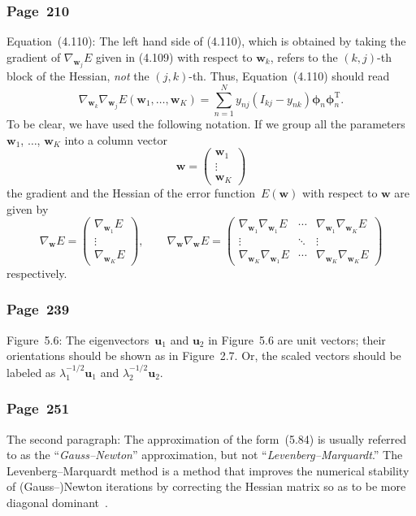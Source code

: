 \documentclass[12pt,a4paper]{article}
\newcommand{\erratum}[1]{\subsubsection*{#1}}
\begin{document}
\erratum{Page~210}
Equation~(4.110):
The left hand side of (4.110),
which is obtained by taking the gradient of $\nabla_{\mathbf{w}_{j}} E$ given in (4.109)
with respect to $\mathbf{w}_{k}$,
refers to the $(k, j)$-th block of the Hessian, \emph{not} the $(j, k)$-th.
Thus, Equation~(4.110) should read
\begin{equation}
\nabla_{\mathbf{w}_{k}} \nabla_{\mathbf{w}_{j}}
E \left( \mathbf{w}_{1}, \dots, \mathbf{w}_{K} \right)
  = \sum_{n=1}^{N} y_{nj} \left( I_{kj} - y_{nk} \right)
    \bm{\phi}_{n} \bm{\phi}_{n}^{\operatorname{T}}.
\end{equation}
To be clear, we have used the following notation.
If we group all the parameters~$\mathbf{w}_{1}$, $\dots$, $\mathbf{w}_{K}$ into
a column vector
\begin{equation}
\mathbf{w} =
  \begin{pmatrix}
  \mathbf{w}_{1} \\
  \vdots \\
  \mathbf{w}_{K}
  \end{pmatrix}
\end{equation}
the gradient and the Hessian of the error function~$E\left(\mathbf{w}\right)$ with respect to
$\mathbf{w}$ are given by
\begin{equation}
\nabla_{\mathbf{w}} E =
  \begin{pmatrix}
  \nabla_{\mathbf{w}_{1}} E \\
  \vdots \\
  \nabla_{\mathbf{w}_{K}} E
  \end{pmatrix} , \qquad
\nabla_{\mathbf{w}} \nabla_{\mathbf{w}} E =
  \begin{pmatrix}
  \nabla_{\mathbf{w}_{1}} \nabla_{\mathbf{w}_{1}} E &
  \cdots &
  \nabla_{\mathbf{w}_{1}} \nabla_{\mathbf{w}_{K}} E \\
  \vdots & \ddots & \vdots \\
  \nabla_{\mathbf{w}_{K}} \nabla_{\mathbf{w}_{1}} E &
  \cdots &
  \nabla_{\mathbf{w}_{K}} \nabla_{\mathbf{w}_{K}} E
  \end{pmatrix}
\end{equation}
respectively.

\erratum{Page~239}
Figure~5.6:
The eigenvectors~$\mathbf{u}_{1}$ and $\mathbf{u}_{2}$ in Figure~5.6 are unit vectors;
their orientations should be shown as in Figure~2.7.
Or, the scaled vectors should be labeled as
$\lambda_{1}^{-1/2}\mathbf{u}_{1}$ and $\lambda_{2}^{-1/2}\mathbf{u}_{2}$.

\erratum{Page~251}
The second paragraph:
The approximation of the form~(5.84) is usually referred to as
the ``\emph{Gauss--Newton}'' approximation, but not ``\emph{Levenberg--Marquardt}.''
The Levenberg--Marquardt method is a method that improves
the numerical stability of (Gauss--)Newton iterations
by correcting the Hessian matrix so as to be more diagonal dominant~\citep{Press:NR}.
\end{document}
